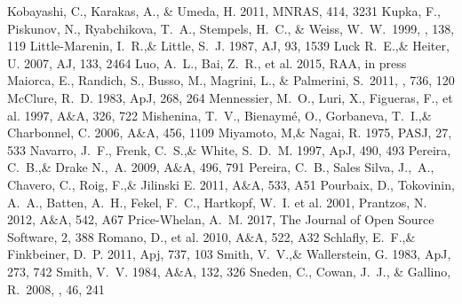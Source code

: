 \documentclass[a4paper,fleqn,usenatbib]{mnras}
\begin{document}
\begin{thebibliography}{99}
Kobayashi, C., Karakas, A., \& Umeda, H. 2011, 
MNRAS, 414, 3231
 Kupka, F., Piskunov, N., Ryabchikova, T.~A., Stempels, H.~C., \& Weiss, W.~W.\ 1999, \aaps, 138, 119 
Little-Marenin, I.~R.,\& Little, S.~J. 1987, 
AJ, 93, 1539
Luck R.~E.,\& Heiter, U. 2007, 
AJ, 133, 2464
Luo, A.~L., Bai, Z.~R., et al. 2015, 
RAA, in press
 Maiorca, E., Randich, S., Busso, M., Magrini, L., \& Palmerini, S.\ 2011, \apj, 736, 120 
McClure, R.~D. 1983, 
ApJ, 268, 264
Mennessier, M.~O., Luri, X., Figueras, F., et al. 1997, 
A$\&$A, 326, 722
Mishenina, T.~V., Bienaym\' e, O., Gorbaneva, T.~I.,\& Charbonnel, C. 2006, 
A$\&$A, 456, 1109
Miyamoto, M,\& Nagai, R. 1975, 
PASJ, 27, 533
Navarro, J.~F., Frenk, C.~S.,\& White, S.~D.~M. 1997, 
ApJ, 490, 493
Pereira, C.~B.,\& Drake N.,~A. 2009, 
A$\&$A, 496, 791
Pereira, C.~B., Sales Silva, J.,~A., Chavero, C., Roig, F.,\& Jilinski E. 2011, 
A$\&$A, 533, A51
Pourbaix, D., Tokovinin, A.~A., Batten, A.~H., Fekel, F.~C., Hartkopf, W.~I. et al. 2001, 
Prantzos, N. 2012, 
A$\&$A, 542, A67
Price-Whelan, A.~M. 2017, 
The Journal of Open Source Software, 2, 388
Romano, D., et al. 2010, 
A$\&$A, 522, A32
Schlafly, E.~F.,\& Finkbeiner, D.~P. 2011, 
Apj, 737, 103
Smith, V.~V.,\& Wallerstein, G. 1983, 
ApJ, 273, 742
Smith, V.~V. 1984, 
A$\&$A, 132, 326
 Sneden, C., Cowan, J.~J., \& Gallino, R.\ 2008, \araa, 46, 241 

\end{thebibliography}
\end{document}

